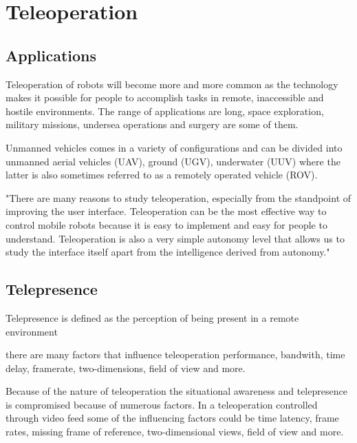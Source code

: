 \section{Teleoperation}


\subsection{Applications}
Teleoperation of robots will become more and more common as the technology makes it possible for people to accomplish tasks in remote, inaccessible and hostile environments. The range of applications are long, space exploration, military missions, undersea operations and surgery are some of them.

Unmanned vehicles comes in a variety of configurations and can be divided into unmanned aerial vehicles (UAV), ground (UGV), underwater (UUV) where the latter is also sometimes referred to as a remotely operated vehicle (ROV).

\citep{Ricks2004} "There are many reasons to study teleoperation, especially from the standpoint of improving the user interface. Teleoperation can be the most effective way to control mobile robots because it is easy to implement and easy for people to understand. Teleoperation is also a very simple autonomy level that allows us to study the interface itself apart from the intelligence derived from autonomy."


\subsection{Telepresence}

Telepresence is defined as the perception of being present in a remote environment 

there are many factors that influence teleoperation performance, bandwith, time delay, framerate, two-dimensions, field of view and more. \citep{Chen2007}

Because of the nature of teleoperation the situational awareness and telepresence is compromised because of numerous factors. In a teleoperation controlled through video feed some of the influencing factors could be time latency, frame rates, missing frame of reference, two-dimensional views, field of view and more.

